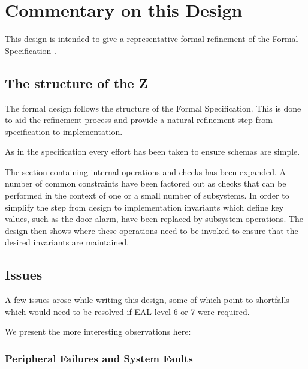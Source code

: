 \chapter{Commentary on this Design}
\label{sec:Summary}

This design is intended to give a representative formal
refinement of the Formal Specification \cite{FS}.

\section{The structure of the Z}
The formal design follows the structure of the Formal Specification.
This is done to aid the refinement process and provide a natural
refinement step from specification to implementation.

As in the specification every effort has been taken to ensure schemas are
simple.

The section containing internal operations and checks has been
expanded. 
A number of common constraints have been factored out
as checks that can be performed in the context of one or a small
number of subsystems. 
In order to simplify the step from
design to implementation invariants which define key values, such as
the door alarm, have been replaced by subsystem operations. The design
then shows where these operations need to be invoked to ensure that
the desired invariants are maintained.

\section{Issues}
A few issues arose while writing this design, some of which point to
shortfalls which would need to be resolved if EAL level 6 or 7 were
required.

We present the more interesting observations here:


\subsection{Peripheral Failures and System Faults}


